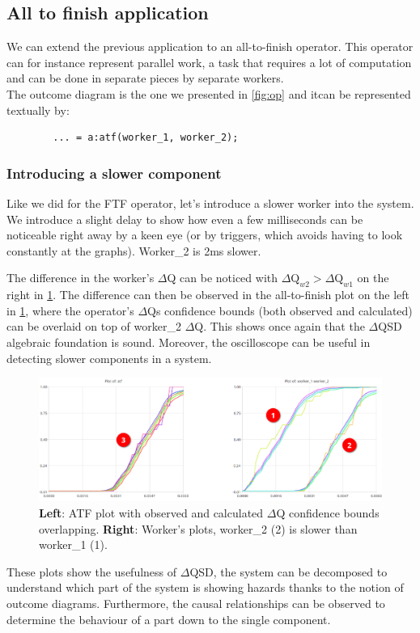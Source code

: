 \subsection{All to finish application}
    We can extend the previous application to an all-to-finish operator. This operator can for instance represent parallel work, a task that requires a lot of computation and can be done in separate pieces by separate workers. \cite{dq-tut} \\
    The outcome diagram is the one we presented in \cref{fig:op} and itcan be represented textually by:
    \begin{verbatim}
        ... = a:atf(worker_1, worker_2);
    \end{verbatim}

        \subsubsection{Introducing a slower component}
            Like we did for the FTF operator, let's introduce a slower worker into the system. We introduce a slight delay to show how even a few milliseconds can be noticeable right away by a keen eye (or by triggers, which avoids having to look constantly at the graphs). Worker\_2 is 2ms slower.
 
            The difference in the worker's $\Delta$Q can be noticed with $\Delta \text{Q}_{w2} > \Delta \text{Q}_{w1}$ on the right in \cref{fig:slower_atf}. The difference can then be observed in the all-to-finish plot on the left in \cref{fig:slower_atf}, where the operator's $\Delta$Qs confidence bounds (both observed and calculated) can be overlaid on top of worker\_2 $\Delta$Q. This shows once again that the $\Delta$QSD algebraic foundation is sound. Moreover, the oscilloscope can be useful in detecting slower components in a system.

            \begin{figure}[H]
                \begin{center}
                    \includegraphics[scale = 0.5]{img/overload_2/w1w2atfa.png}
                \end{center}
                \caption{\textbf{Left}: ATF plot with observed and calculated $\Delta$Q confidence bounds overlapping. \textbf{Right}: Worker's plots, worker\_2 (2) is slower than worker\_1 (1).}
                \label{fig:slower_atf}
            \end{figure}

    These plots show the usefulness of $\Delta$QSD, the system can be decomposed to understand which part of the system is showing hazards thanks to the notion of outcome diagrams. Furthermore, the causal relationships can be observed to determine the behaviour of a part down to the single component.
